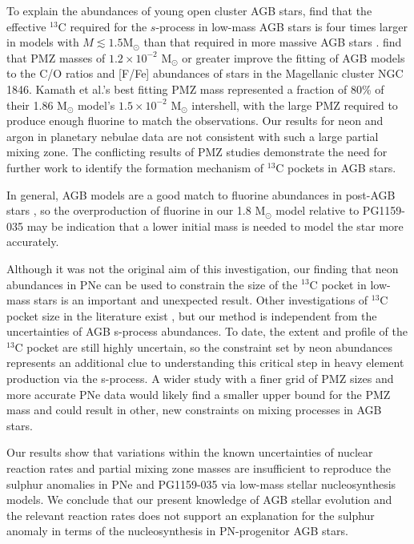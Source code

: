 To explain the abundances of young open cluster AGB stars, \citet{Maiorca:2012dk} find that the effective
$^{13}$C required for the $s$-process in low-mass AGB stars is four times larger in models with $M \lesssim 1.5 $M$_\odot$ than that required
in more massive AGB stars \citep[but see the discussion in][]{DOrazi:2012eu}. \citet{Kamath:2012jk} find that PMZ masses of $1.2 \times 10^{-2}$ M$_\odot$ or greater improve the fitting of AGB models to the C/O ratios and [F/Fe] abundances of stars in the Magellanic cluster NGC 1846. Kamath et al.'s best fitting PMZ mass represented a fraction of 80\% of their 1.86 M$_\odot$ model's $1.5 \times 10^{-2}$ M$_\odot$ intershell, with the large PMZ required to produce enough fluorine to match the observations. Our results for neon and argon in planetary nebulae data are not consistent with such a large partial mixing zone. The conflicting results of PMZ studies demonstrate the need for further work to identify the formation mechanism of $^{13}$C pockets in AGB stars.

In general, AGB models are a good match to fluorine abundances in post-AGB stars \citep[e.g.,][]{Werner:2005io}, so the overproduction of fluorine in our 1.8 M$_\odot$ model relative to PG1159-035 may be indication that a lower initial mass is needed to model the star more accurately.

Although it was not the original aim of this investigation, our finding that neon abundances in PNe can be used to constrain the size of the $^{13}$C pocket in low-mass stars is an important and unexpected result. Other investigations of $^{13}$C pocket size in the literature exist \citep[e.g.,][]{BonacicMarinovic:2007hw}, but our method is independent from the uncertainties of AGB s-process abundances. To date, the extent and profile of the $^{13}$C pocket are still highly uncertain, so the constraint set by neon abundances represents an additional clue to understanding this critical step in heavy element production via the s-process. A wider study with a finer grid of PMZ sizes and more accurate PNe data would likely find a smaller upper bound for the PMZ mass and could result in other, new constraints on mixing processes in AGB stars.

Our results show that variations within the known uncertainties of nuclear reaction rates and partial mixing zone masses are insufficient to reproduce the sulphur anomalies in PNe and PG1159-035 via low-mass stellar nucleosynthesis models. We conclude that our present knowledge of AGB stellar evolution and the relevant reaction rates does not support an explanation for the sulphur anomaly in terms of the nucleosynthesis in PN-progenitor AGB stars.

